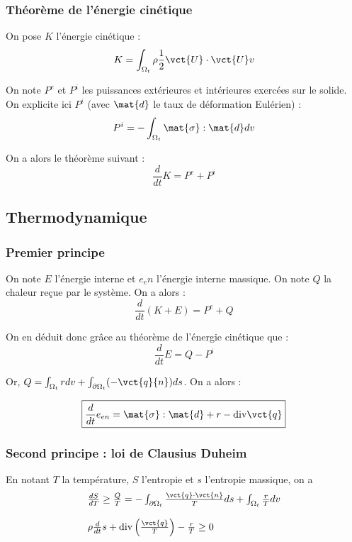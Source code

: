 \documentclass[11pt,a4paper]{article}
\begin{document}
\subsubsection{Théorème de l'énergie cinétique}
On pose $K$ l'énergie cinétique :
\begin{equation}
K=\int_{\Omega_t}\rho\frac{1}{2}\vct{U}\cdot\vct{U}v
\end{equation}

On note $P^{e}$ et $P^{i}$ les puissances extérieures et intérieures exercées sur le solide. On explicite ici $P^{i}$ (avec $\mat{d}$ le taux de déformation Eulérien) :
\begin{equation}
P^{i}=-\int_{\Omega_t}\mat{\sigma}:\mat{d}dv
\end{equation}

On a alors le théorème suivant :
\begin{equation}
\frac{d}{dt}K=P^{e}+P^{i}
\end{equation}

\subsection{Thermodynamique}
\subsubsection{Premier principe}
On note $E$ l'énergie interne et $e_en$ l'énergie interne massique. On note $Q$ la chaleur reçue par le système. On a alors :
\begin{equation}
\frac{d}{dt}\left(K+E\right)=P^{e}+Q
\end{equation}

On en déduit donc grâce au théorème de l'énergie cinétique que :
\begin{equation}
\frac{d}{dt}E=Q-P^{i}
\end{equation}

Or, $Q=\int_{\Omega_t}rdv+\int_{\partial\Omega_t}(-\vct{q}{n})ds$. On a alors :

\begin{equation}
\label{eq:consenergie}
\boxed{\frac{d}{dt} e_{en}=\mat{\sigma}:\mat{d}+r-\textrm{div}\vct{q} }
\end{equation}

\subsubsection{Second principe : loi de Clausius Duheim}
En notant $T$ la température, $S$ l'entropie et $s$ l'entropie massique, on a 
\begin{equation}
\begin{array}{l}
\frac{dS}{dT}\geq\frac{Q}{T}=-\int_{\partial\Omega_t}\frac{\vct{q}\cdot\vct{n}}{T}ds+\int_{\Omega_t}\frac{r}{T}dv \\
\\
\rho\frac{d}{dt}s+\textrm{div}\left(\frac{\vct{q}}{T}\right)-\frac{r}{T}\geq 0
\end{array}
\end{equation}
\end{document}
